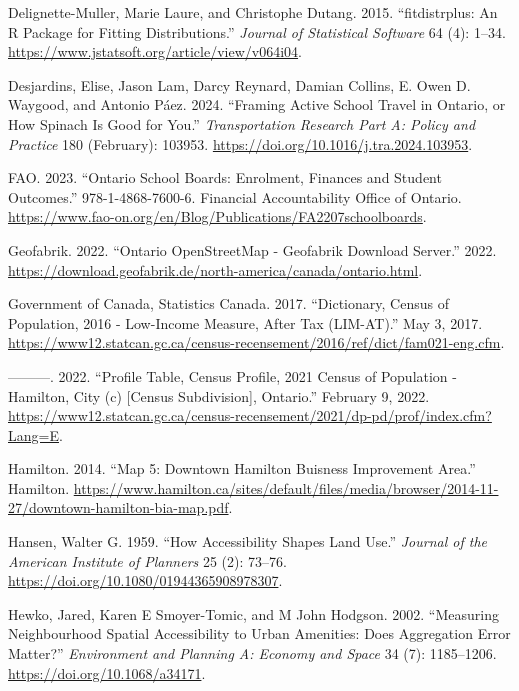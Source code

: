 \documentclass[
default
]{sn-jnl}
\newlength{\cslhangindent}
\newenvironment{CSLReferences}[2] %
 {\begin{list}{}{%
  \setlength{\itemindent}{0pt}
  \setlength{\leftmargin}{0pt}
  \setlength{\parsep}{0pt}
  \ifodd #1
   \setlength{\leftmargin}{\cslhangindent}
   \setlength{\itemindent}{-1\cslhangindent}
  \fi
  \setlength{\itemsep}{#2\baselineskip}}}
 {\end{list}}
\begin{document}
\begin{CSLReferences}{1}{0}
Delignette-Muller, Marie Laure, and Christophe Dutang. 2015.
{``{fitdistrplus}: An {R} Package for Fitting Distributions.''}
\emph{Journal of Statistical Software} 64 (4): 1--34.
\url{https://www.jstatsoft.org/article/view/v064i04}.

Desjardins, Elise, Jason Lam, Darcy Reynard, Damian Collins, E. Owen D.
Waygood, and Antonio Páez. 2024. {``Framing Active School Travel in
{Ontario}, or How Spinach Is Good for You.''} \emph{Transportation
Research Part A: Policy and Practice} 180 (February): 103953.
\url{https://doi.org/10.1016/j.tra.2024.103953}.

FAO. 2023. {``Ontario School Boards: Enrolment, Finances and Student
Outcomes.''} 978-1-4868-7600-6. Financial Accountability Office of
Ontario.
\url{https://www.fao-on.org/en/Blog/Publications/FA2207schoolboards}.

Geofabrik. 2022. {``Ontario {OpenStreetMap} - {Geofabrik Download
Server}.''} 2022.
\url{https://download.geofabrik.de/north-america/canada/ontario.html}.

Government of Canada, Statistics Canada. 2017. {``Dictionary, Census of
Population, 2016 - Low-Income Measure, After Tax ({LIM}-{AT}).''} May 3,
2017.
\url{https://www12.statcan.gc.ca/census-recensement/2016/ref/dict/fam021-eng.cfm}.

---------. 2022. {``Profile Table, Census Profile, 2021 Census of
Population - Hamilton, City (c) {[}Census Subdivision{]}, Ontario.''}
February 9, 2022.
\url{https://www12.statcan.gc.ca/census-recensement/2021/dp-pd/prof/index.cfm?Lang=E}.

Hamilton. 2014. {``Map 5: Downtown Hamilton Buisness Improvement
Area.''} Hamilton.
\url{https://www.hamilton.ca/sites/default/files/media/browser/2014-11-27/downtown-hamilton-bia-map.pdf}.

Hansen, Walter G. 1959. {``How {Accessibility Shapes Land Use}.''}
\emph{Journal of the American Institute of Planners} 25 (2): 73--76.
\url{https://doi.org/10.1080/01944365908978307}.

Hewko, Jared, Karen E Smoyer-Tomic, and M John Hodgson. 2002.
{``Measuring Neighbourhood Spatial Accessibility to Urban Amenities:
Does Aggregation Error Matter?''} \emph{Environment and Planning A:
Economy and Space} 34 (7): 1185--1206.
\url{https://doi.org/10.1068/a34171}.


\end{CSLReferences}
\end{document}
